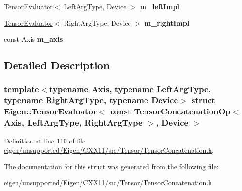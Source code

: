 \begin{DoxyCompactItemize}
\hyperlink{struct_eigen_1_1_tensor_evaluator}{Tensor\+Evaluator}$<$ Left\+Arg\+Type, Device $>$ {\bfseries m\+\_\+left\+Impl}
\item 
\mbox{\label{struct_eigen_1_1_tensor_evaluator_3_01const_01_tensor_concatenation_op_3_01_axis_00_01_left_arg_e37e1b61d31098a96aab7c22793b325c_a475904f988aeaa3f63d76d44b1d25a5a}} 
\hyperlink{struct_eigen_1_1_tensor_evaluator}{Tensor\+Evaluator}$<$ Right\+Arg\+Type, Device $>$ {\bfseries m\+\_\+right\+Impl}
\item 
\mbox{\label{struct_eigen_1_1_tensor_evaluator_3_01const_01_tensor_concatenation_op_3_01_axis_00_01_left_arg_e37e1b61d31098a96aab7c22793b325c_af284e100c24b6ba9c17bf03e75f621d5}} 
const Axis {\bfseries m\+\_\+axis}
\end{DoxyCompactItemize}


\subsection{Detailed Description}
\subsubsection*{template$<$typename Axis, typename Left\+Arg\+Type, typename Right\+Arg\+Type, typename Device$>$\newline
struct Eigen\+::\+Tensor\+Evaluator$<$ const Tensor\+Concatenation\+Op$<$ Axis, Left\+Arg\+Type, Right\+Arg\+Type $>$, Device $>$}



Definition at line \hyperlink{eigen_2unsupported_2_eigen_2_c_x_x11_2src_2_tensor_2_tensor_concatenation_8h_source_l00110}{110} of file \hyperlink{eigen_2unsupported_2_eigen_2_c_x_x11_2src_2_tensor_2_tensor_concatenation_8h_source}{eigen/unsupported/\+Eigen/\+C\+X\+X11/src/\+Tensor/\+Tensor\+Concatenation.\+h}.



The documentation for this struct was generated from the following file\+:\begin{DoxyCompactItemize}
\item 
eigen/unsupported/\+Eigen/\+C\+X\+X11/src/\+Tensor/\+Tensor\+Concatenation.\+h\end{DoxyCompactItemize}
